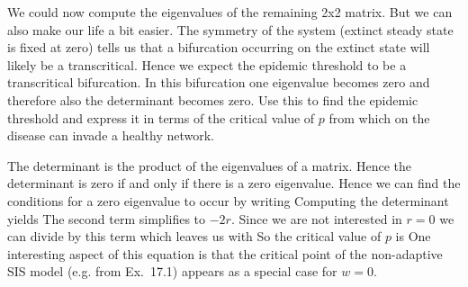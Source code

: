 \subquestion 
We could now compute the eigenvalues of the remaining 2x2 matrix. But we can also make our life a bit easier. The symmetry of the system (extinct steady state is fixed at zero) tells us that a bifurcation occurring on the extinct state will likely be a transcritical. Hence we expect the epidemic threshold to be a transcritical bifurcation. In this bifurcation one eigenvalue becomes zero and therefore also the determinant becomes zero. Use this to find the epidemic threshold and express it in terms of the critical value of $p$ from which on the disease can invade a healthy network. 

\solution
The determinant is the product of the eigenvalues of a matrix. Hence the determinant is zero if and only if there is a zero eigenvalue. Hence we can find the conditions for a zero eigenvalue to occur by writing 
Computing the determinant yields 
The second term simplifies to $-2r$. Since we are not interested in $r=0$ we can divide by this term which leaves us with 
So the critical value of $p$ is 
One interesting aspect of this equation is that the critical point of the non-adaptive SIS model (e.g. from Ex.~17.1) appears as a special case for $w=0$. 